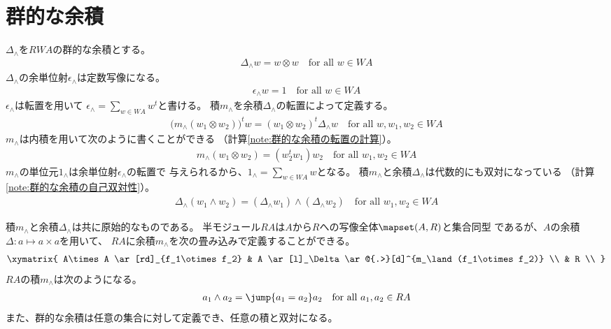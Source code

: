 \section{群的な余積}\label{s1:群的な余積} %
	$\Delta_\land$を$RWA$の群的な余積とする。
	\begin{equation*}\begin{split} %
		\Delta_\land w = w\otimes w \quad\text{for all }w\in WA
	\end{split}\end{equation*} %
	$\Delta_\land$の余単位射$\epsilon_\land$は定数写像になる。
	\begin{equation*}\begin{split} %
		\epsilon_\land w = 1 \quad\text{for all }w\in WA
	\end{split}\end{equation*} %
	$\epsilon_\land$は転置を用いて
	$\epsilon_\land=\sum_{w\in WA}w^t$と書ける。
	積$m_\land$を余積$\Delta_\land$の転置によって定義する。
	\begin{equation}\label{eq:群的余積の転置の定義}\begin{split} %
		\bigl(m_\land(w_1\otimes w_2)\bigr)^tw 
		= (w_1\otimes w_2)^t\Delta_\land w
		\quad\text{for all }w,w_1,w_2\in WA
	\end{split}\end{equation} %
	$m_\land$は内積を用いて次のように書くことができる
	（計算\ref{note:群的な余積の転置の計算}）。
	\begin{equation*}\begin{split} %
		m_\land(w_1\otimes w_2) = (w_2^tw_1)w_2
		\quad\text{for all }w_1,w_2\in WA
	\end{split}\end{equation*} %
	$m_\land$の単位元$1_\land$は余単位射$\epsilon_\land$の転置で
	与えられるから、$1_\land=\sum_{w\in WA}w$となる。
	積$m_\land$と余積$\Delta_\land$は代数的にも双対になっている
	（計算\ref{note:群的な余積の自己双対性}）。
	\begin{equation*}\begin{split} %
		\Delta_\land(w_1\land w_2) = (\Delta_\land w_1)\land(\Delta_\land w_2)
		\quad\text{for all }w_1,w_2\in WA
	\end{split}\end{equation*} %

	積$m_\land$と余積$\Delta_\land$は共に原始的なものである。
	半モジュール$RA$は$A$から$R$への写像全体$\mapset(A,R)$と集合同型
	であるが、$A$の余積$\Delta:a\mapsto a\times a$を用いて、
	$RA$に余積$m_\land$を次の畳み込みで定義することができる。
	\begin{equation*}\xymatrix{
		A\times A \ar[rd]_{f_1\otimes f_2}
			& A \ar[l]_\Delta \ar@{.>}[d]^{m_\land(f_1\otimes f_2)} \\
		& R \\
	}\end{equation*}
	$RA$の積$m_\land$は次のようになる。
	\begin{equation*}\begin{split} %
		a_1\land a_2=\jump{a_1=a_2}a_2 \quad\text{for all }a_1,a_2\in RA
	\end{split}\end{equation*} %
	また、群的な余積は任意の集合に対して定義でき、任意の積と双対になる。

